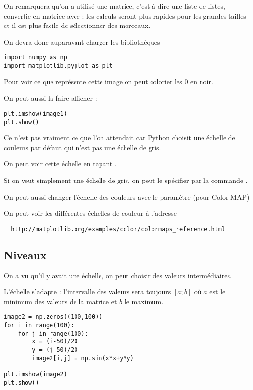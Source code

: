 On remarquera qu'on a utilisé une matrice, c'est-à-dire une liste de listes, convertie en matrice  avec  : les calculs seront plus rapides pour les grandes tailles et il est plus facile de sélectionner des morceaux.

On devra donc auparavant charger les bibliothèques
\begin{lstlisting}
import numpy as np
import matplotlib.pyplot as plt
\end{lstlisting}

Pour voir ce que représente cette image on peut colorier les 0 en noir.

On peut aussi la faire afficher : 
\begin{lstlisting}
plt.imshow(image1)
plt.show()
\end{lstlisting}
Ce n'est pas vraiment ce que l'on attendait car Python choisit une échelle de couleurs par défaut qui n'est pas une échelle de gris.
  
On peut voir cette échelle en tapant .
  
Si on veut simplement une échelle de gris, on peut le spécifier par la commande .

On peut aussi changer l'échelle des couleurs avec le paramètre  (pour Color MAP)
  
  
On peut voir les différentes échelles de couleur à l'adresse
  
\begin{verbatim}
  http://matplotlib.org/examples/color/colormaps_reference.html
\end{verbatim}
\subsection{Niveaux}
On a vu qu'il y avait une échelle, on peut choisir des valeurs intermédiaires. 

L'échelle s'adapte : l'intervalle des valeurs sera toujours $[a;b]$ où $a$ est le minimum des valeurs de la matrice et $b$ le maximum.

\begin{lstlisting}
image2 = np.zeros((100,100))
for i in range(100):
    for j in range(100):
        x = (i-50)/20
        y = (j-50)/20
        image2[i,j] = np.sin(x*x+y*y)

plt.imshow(image2)
plt.show()
\end{lstlisting}

